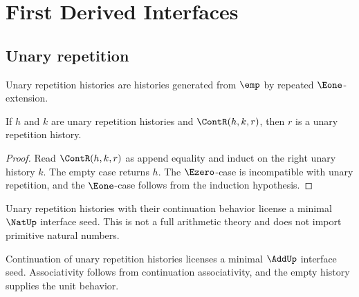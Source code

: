 \chapter{First Derived Interfaces}
\label{ch:core-first-derived-interfaces}

\section{Unary repetition}

\begin{definition}
\label{def:core-unary-repetition-histories}
Unary repetition histories are histories generated from \(\emp\) by repeated \(\Eone\)-extension.
\end{definition}

\begin{proposition}
\label{prop:unary-repetition-closed-under-continuation}
If \(h\) and \(k\) are unary repetition histories and \(\ContR(h,k,r)\), then \(r\) is a unary repetition history.
\end{proposition}
\begin{proof}
Read \(\ContR(h,k,r)\) as append equality and induct on the right unary history \(k\). The empty case returns \(h\). The \(\Ezero\)-case is incompatible with unary repetition, and the \(\Eone\)-case follows from the induction hypothesis.
\end{proof}

\begin{corollary}
\label{cor:natural-number-like-interface-seed}
Unary repetition histories with their continuation behavior license a minimal \(\NatUp\) interface seed. This is not a full arithmetic theory and does not import primitive natural numbers.
\end{corollary}

\begin{corollary}
\label{cor:addition-like-interface-seed}
Continuation of unary repetition histories licenses a minimal \(\AddUp\) interface seed. Associativity follows from continuation associativity, and the empty history supplies the unit behavior.
\end{corollary}

